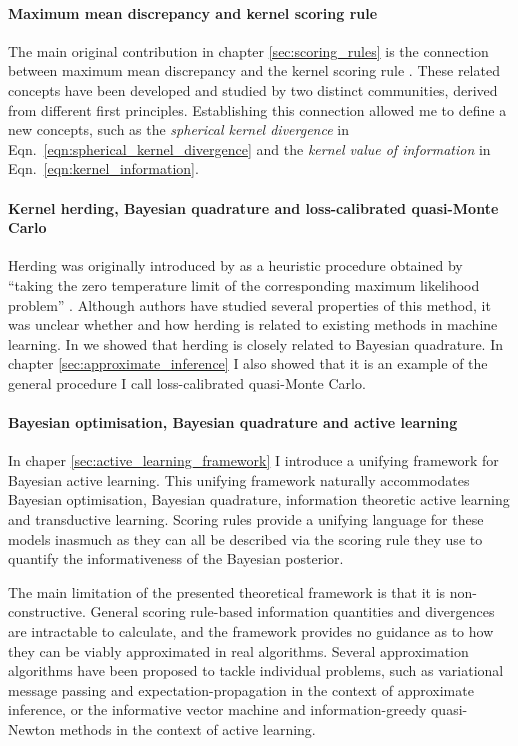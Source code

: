 \paragraph{Maximum mean discrepancy and kernel scoring rule} The main original contribution in chapter \ref{sec:scoring_rules} is the connection between maximum mean discrepancy \citep{Gretton2012} and the kernel scoring rule \citep{Jose2008}. These related concepts have been developed and studied by two distinct communities, derived from different first principles. Establishing this connection allowed me to define a new concepts, such as the \emph{spherical kernel divergence} in Eqn.\ \eqref{eqn:spherical_kernel_divergence} and the \emph{kernel value of information} in Eqn.\ \eqref{eqn:kernel_information}.

\paragraph{Kernel herding, Bayesian quadrature and loss-calibrated quasi-Monte Carlo} Herding was originally introduced by \citet{welling2009herding} as a heuristic procedure obtained by ``taking the zero temperature limit of the corresponding maximum likelihood problem'' \citep[quoted from][]{welling2009herding}. Although authors have studied several properties of this method, it was unclear whether and how herding is related to existing methods in machine learning. In \citep{Huszar2012herding} we showed that herding is closely related to Bayesian quadrature. In chapter \ref{sec:approximate_inference} I also showed that it is an example of the general procedure I call loss-calibrated quasi-Monte Carlo.

\paragraph{Bayesian optimisation, Bayesian quadrature and active learning} In chaper \ref{sec:active_learning_framework} I introduce a unifying framework for Bayesian active learning. This unifying framework naturally accommodates Bayesian optimisation, Bayesian quadrature, information theoretic active learning and transductive learning. Scoring rules provide a unifying language for these models inasmuch as they can all be described via the scoring rule they use to quantify the informativeness of the Bayesian posterior.

\vspace{11pt}

The main limitation of the presented theoretical framework is that it is non-constructive. General scoring rule-based information quantities and divergences are intractable to calculate, and the framework provides no guidance as to how they can be viably approximated in real algorithms. Several approximation algorithms have been proposed to tackle individual problems, such as variational message passing \citep{Winn2006} and expectation-propagation \citep{Minka2001} in the context of approximate inference, or the informative vector machine \citep{Lawrence2004} and information-greedy quasi-Newton methods \citep{Hennig2012newton} in the context of active learning.

